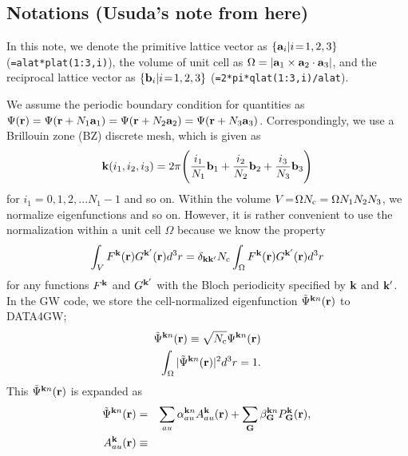 \documentclass[a4paper,10pt,epsf,fleqn]{article}
\begin{document}
{{{\begin{thebibliography}{00}
\section{Notations (Usuda's note from here)}
In this note, we denote the primitive lattice vector as
$\{{\bf a}_i| i\!=\!1,2,3\}$ (\verb#=alat*plat(1:3,i)#), 
the volume of unit cell as
$\Omega=|{\bf a}_1 \times {\bf a}_2 \cdot {\bf a}_3|$, and
the reciprocal lattice vector as $\{{\bf b}_i| i\!=\!1,2,3\}$
(\verb#=2*pi*qlat(1:3,i)/alat#).

We assume the periodic boundary condition for
quantities as $\Psi({\bf r}) = \Psi({\bf r}+ N_1 {\bf a}_1)
= \Psi({\bf r}+ N_2 {\bf a}_2)= \Psi({\bf r}+ N_3 {\bf a}_3)$.
Correspondingly, we use a Brillouin zone (BZ) discrete mesh, 
which is given as
\begin{eqnarray}
{\bf k}(i_1,i_2,i_3)= 2 \pi \Biggr( \frac{i_1}{N_1} {\bf b}_1 
+ \frac{i_2}{N_2} {\bf b}_2 + \frac{i_3}{N_3} {\bf b}_3 \Biggr)
\label{kmesh}
\end{eqnarray}
for $i_1=\!0,\!1,\!2,...N_1\!-\!1$ and so on.
Within the volume $V\!=\!\Omega N_{\rm c}=\Omega N_1N_2N_3$, 
we normalize eigenfunctions 
and so on. However, it is rather convenient to use 
the normalization within a unit cell $\Omega$ because we know
the property
\begin{eqnarray}
  \int_V F^{\bf k} ({\bf r}) G^{\bf k'} ({\bf r}) d^3r = \delta_{\bf k k'} 
  N_{\rm c} \int_\Omega F^{\bf k} ({\bf r}) G^{\bf k'} ({\bf r}) d^3r
\end{eqnarray}
for any functions $F^{\bf k}$ and $G^{\bf k'}$ 
with the Bloch periodicity specified by ${\bf k}$ and ${\bf k'}$.
In the GW code, we store the cell-normalized eigenfunction 
$\tilde{\Psi}^{{\bf k}n}({\bf r})$ to {\sf DATA4GW};
\begin{eqnarray}
  \tilde{\Psi}^{{\bf k}n}({\bf r}) 
  \equiv %
  \sqrt{N_{\rm c}}\Psi^{{\bf k}n}({\bf r}) \\
  \int_\Omega |\tilde{\Psi}^{{\bf k}n}({\bf r})|^2 d^3r =1.
\end{eqnarray}
This $\tilde{\Psi}^{{\bf k}n}({\bf r})$ is expanded as
\begin{eqnarray}
\hspace{-3cm}\tilde{\Psi}^{{\bf k}n}({\bf r}) 
&=& \sum_{a u} \alpha^{{\bf k} n}_{au} A^{\bf k}_{a u}({\bf r})
 + \sum_{\bf G} \beta^{{\bf k}n}_{\bf G} P^{\bf k}_{\bf G}({\bf r}), \\
A^{\bf k}_{a u}({\bf r}) &\equiv& 

\end{eqnarray}
\end{thebibliography}}}}
\end{document}
